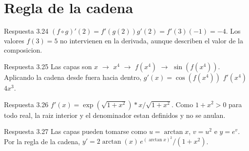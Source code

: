 \documentclass[10pt,a4paper,oneside,openany]{book}
\begin{document}
\section{Regla de la cadena}
\begin{PSevenAnswerFixed}{Respuesta 3.24}
\((f\circ g)'(2)=f'(g(2))g'(2)=f'(3)(-1)=-4\). Los valores \(f(3)=5\) no intervienen en la derivada, aunque describen el valor de la composicion.
\end{PSevenAnswerFixed}
\begin{PSevenAnswerFixed}{Respuesta 3.25}
Las capas son \(x\) \(\to \) \(x^{4}\) \(\to \) \(f(x^{4})\) \(\to \) \(\sin(f(x^{4}))\). Aplicando la cadena desde fuera hacia dentro, \(g'(x)=\cos(f(x^{4}))\) \(f'(x^{4})\) \(4x^{3}\).
\end{PSevenAnswerFixed}
\begin{PSevenAnswerFixed}{Respuesta 3.26}
\(f'(x)=\exp(\sqrt{1+x^{2}})*x/\sqrt{1+x^{2}}\). Como \(1+x^{2}>0\) para todo real, la raiz interior y el denominador estan definidos y no se anulan.
\end{PSevenAnswerFixed}
\begin{PSevenAnswerFixed}{Respuesta 3.27}
Las capas pueden tomarse como \(u=\arctan x\), \(v=u^2\) e \(y=e^v\). Por la regla de la cadena, \(y'=2\arctan(x)\,e^{(\arctan x)^2}/(1+x^2)\).
\end{PSevenAnswerFixed}
\end{document}
